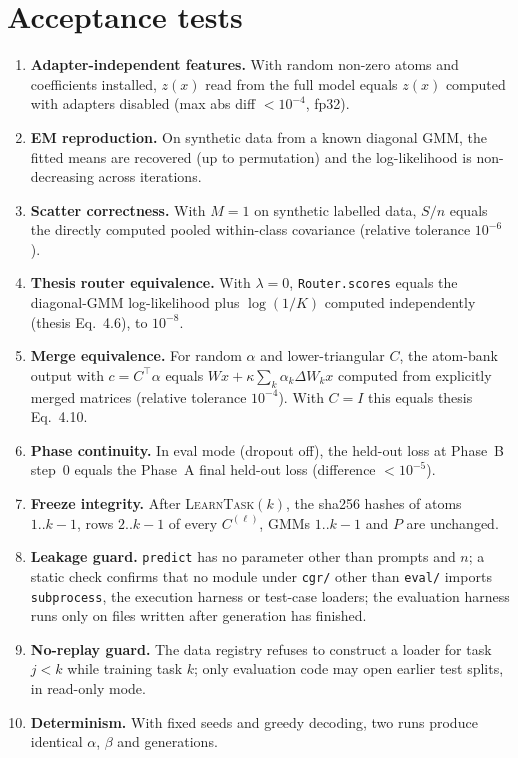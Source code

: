 \documentclass[11pt]{article}
\newcommand{\T}{^{\top}}
\begin{document}
\section{Acceptance tests}\label{sec:tests}

\begin{enumerate}[label=T\arabic*., leftmargin=*]
  \item \textbf{Adapter-independent features.} With random non-zero atoms and coefficients installed, $z(x)$ read
        from the full model equals $z(x)$ computed with adapters disabled (max abs diff $<10^{-4}$, fp32).
  \item \textbf{EM reproduction.} On synthetic data from a known diagonal GMM, the fitted means are recovered
        (up to permutation) and the log-likelihood is non-decreasing across iterations.
  \item \textbf{Scatter correctness.} With $M=1$ on synthetic labelled data, $S/n$ equals the directly computed
        pooled within-class covariance (relative tolerance $10^{-6}$).
  \item \textbf{Thesis router equivalence.} With $\lambda=0$, \texttt{Router.scores} equals the diagonal-GMM
        log-likelihood plus $\log(1/K)$ computed independently (thesis Eq.~4.6), to $10^{-8}$.
  \item \textbf{Merge equivalence.} For random $\alpha$ and lower-triangular $C$, the atom-bank output with
        $c=C\T\alpha$ equals $Wx+\kappa\sum_k\alpha_k\Delta W_k x$ computed from explicitly merged matrices
        (relative tolerance $10^{-4}$). With $C=I$ this equals thesis Eq.~4.10.
  \item \textbf{Phase continuity.} In eval mode (dropout off), the held-out loss at Phase~B step~0 equals the
        Phase~A final held-out loss (difference $<10^{-5}$).
  \item \textbf{Freeze integrity.} After \textsc{LearnTask}$(k)$, the sha256 hashes of atoms $1..k-1$, rows
        $2..k-1$ of every $C^{(\ell)}$, GMMs $1..k-1$ and $P$ are unchanged.
  \item \textbf{Leakage guard.} \texttt{predict} has no parameter other than prompts and $n$; a static check
        confirms that no module under \texttt{cgr/} other than \texttt{eval/} imports \texttt{subprocess},
        the execution harness or test-case loaders; the evaluation harness runs only on files written after
        generation has finished.
  \item \textbf{No-replay guard.} The data registry refuses to construct a loader for task $j<k$ while training
        task $k$; only evaluation code may open earlier test splits, in read-only mode.
  \item \textbf{Determinism.} With fixed seeds and greedy decoding, two runs produce identical $\alpha$, $\beta$
        and generations.
\end{enumerate}
\end{document}
